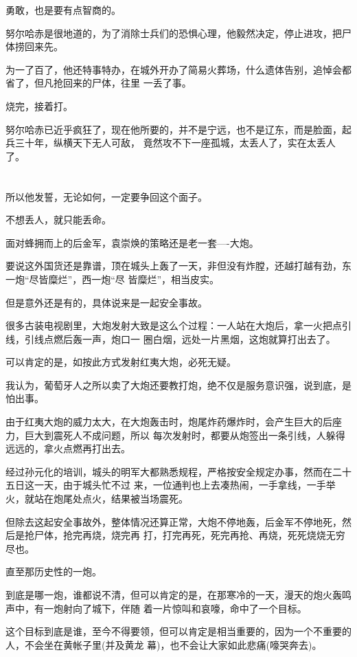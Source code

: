 \documentclass[11pt,a4paper,onecolumn]{article}
\begin{document}
勇敢，也是要有点智商的。

努尔哈赤是很地道的，为了消除士兵们的恐惧心理，他毅然决定，停止进攻，把尸体捞回来先。

为一了百了，他还特事特办，在城外开办了简易火葬场，什么遗体告别，追悼会都省了，但凡抢回来的尸体，往里
一丢了事。

烧完，接着打。

努尔哈赤已近乎疯狂了，现在他所要的，并不是宁远，也不是辽东，而是脸面，起兵三十年，纵横天下无人可敌，
竟然攻不下一座孤城，太丢人了，实在太丢人了。

\section[\thesection]{}

所以他发誓，无论如何，一定要争回这个面子。

不想丢人，就只能丢命。

面对蜂拥而上的后金军，袁崇焕的策略还是老一套----大炮。

要说这外国货还是靠谱，顶在城头上轰了一天，非但没有炸膛，还越打越有劲，东一炮``尽皆糜烂''，西一炮``尽
皆糜烂''，相当皮实。

但是意外还是有的，具体说来是一起安全事故。

很多古装电视剧里，大炮发射大致是这么个过程：一人站在大炮后，拿一火把点引线，引线点燃后轰一声，炮口一
圈白烟，远处一片黑烟，这炮就算打出去了。

可以肯定的是，如按此方式发射红夷大炮，必死无疑。

我认为，葡萄牙人之所以卖了大炮还要教打炮，绝不仅是服务意识强，说到底，是怕出事。

由于红夷大炮的威力太大，在大炮轰击时，炮尾炸药爆炸时，会产生巨大的后座力，巨大到震死人不成问题，所以
每次发射时，都要从炮签出一条引线，人躲得远远的，拿火点燃再打出去。

经过孙元化的培训，城头的明军大都熟悉规程，严格按安全规定办事，然而在二十五日这一天，由于城头忙不过
来，一位通判也上去凑热闹，一手拿线，一手举火，就站在炮尾处点火，结果被当场震死。

但除去这起安全事故外，整体情况还算正常，大炮不停地轰，后金军不停地死，然后是抢尸体，抢完再烧，烧完再
打，打完再死，死完再抢、再烧，死死烧烧无穷尽也。

直至那历史性的一炮。

到底是哪一炮，谁都说不清，但可以肯定的是，在那寒冷的一天，漫天的炮火轰鸣声中，有一炮射向了城下，伴随
着一片惊叫和哀嚎，命中了一个目标。

这个目标到底是谁，至今不得要领，但可以肯定是相当重要的，因为一个不重要的人，不会坐在黄帐子里(并及黄龙
幕)，也不会让大家如此悲痛(嚎哭奔去)。
\end{document}
